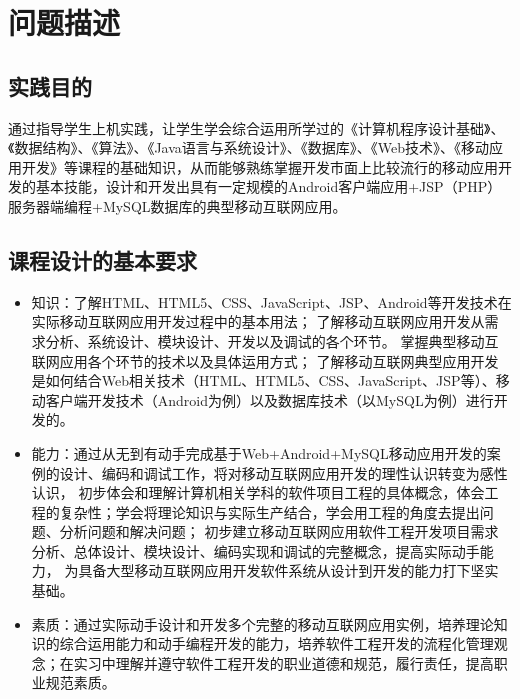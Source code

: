 \documentclass[UTF8,12pt]{article}
\begin{document}
\begin{titlepage}
    
\end{titlepage}

\begin{center}
    \tableofcontents
\end{center}
\newpage

\section{问题描述}
\subsection{实践目的}
通过指导学生上机实践，让学生学会综合运用所学过的《计算机程序设计基础》、《数据结构》、《算法》、《Java语言与系统设计》、《数据库》、《Web技术》、《移动应用开发》等课程的基础知识，从而能够熟练掌握开发市面上比较流行的移动应用开发的基本技能，设计和开发出具有一定规模的Android客户端应用+JSP（PHP）服务器端编程+MySQL数据库的典型移动互联网应用。

\subsection{课程设计的基本要求}
\begin{itemize}
    \item 知识：了解HTML、HTML5、CSS、JavaScript、JSP、Android等开发技术在实际移动互联网应用开发过程中的基本用法；
    了解移动互联网应用开发从需求分析、系统设计、模块设计、开发以及调试的各个环节。
    掌握典型移动互联网应用各个环节的技术以及具体运用方式；
    了解移动互联网典型应用开发是如何结合Web相关技术（HTML、HTML5、CSS、JavaScript、JSP等）、移动客户端开发技术（Android为例）以及数据库技术（以MySQL为例）进行开发的。
    \item 能力：通过从无到有动手完成基于Web+Android+MySQL移动应用开发的案例的设计、编码和调试工作，将对移动互联网应用开发的理性认识转变为感性认识，
    初步体会和理解计算机相关学科的软件项目工程的具体概念，体会工程的复杂性；学会将理论知识与实际生产结合，学会用工程的角度去提出问题、分析问题和解决问题；
    初步建立移动互联网应用软件工程开发项目需求分析、总体设计、模块设计、编码实现和调试的完整概念，提高实际动手能力，
    为具备大型移动互联网应用开发软件系统从设计到开发的能力打下坚实基础。
    \item 素质：通过实际动手设计和开发多个完整的移动互联网应用实例，培养理论知识的综合运用能力和动手编程开发的能力，培养软件工程开发的流程化管理观念；在实习中理解并遵守软件工程开发的职业道德和规范，履行责任，提高职业规范素质。
\end{itemize}
\end{document}
